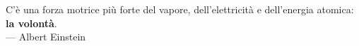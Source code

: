 

\cleardoublepage
{}
\thispagestyle{empty}

\vspace*{3cm}

\begin{center}
	C'è una forza motrice più forte del vapore, dell'elettricità e dell'energia atomica: \textbf{la volontà}. \\ \medskip
	--- Albert Einstein
\end{center}
\medskip